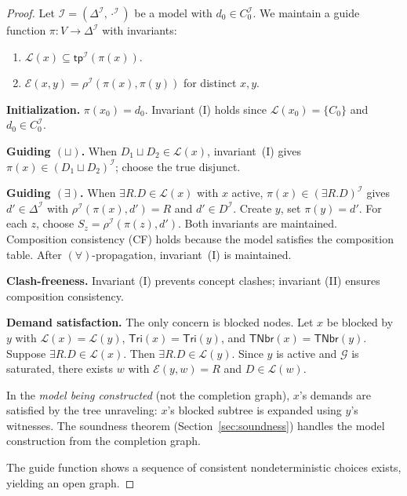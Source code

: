 \documentclass[a4paper,11pt]{article}
\theoremstyle{definition}
\newcommand{\tp}{\ensuremath{\mathsf{tp}}}
\newcommand{\Tri}{\ensuremath{\mathsf{Tri}}}
\newcommand{\TNbr}{\ensuremath{\mathsf{TNbr}}}
\newcommand{\interp}{\ensuremath{\mathcal{I}}}
\newcommand{\DeltaI}{\ensuremath{\Delta^{\mathcal{I}}}}
\newcommand{\GG}{\ensuremath{\mathcal{G}}}
\newcommand{\LL}{\ensuremath{\mathcal{L}}}
\newcommand{\EE}{\ensuremath{\mathcal{E}}}
\begin{document}
\begin{proof}
Let $\interp = (\DeltaI, \cdot^{\interp})$ be a model with
$d_0 \in C_0^{\interp}$.  We maintain a guide function
$\pi: V \to \DeltaI$ with invariants:
\begin{enumerate}[nosep,label=(\Roman*)]
  \item $\LL(x) \subseteq \tp^{\interp}(\pi(x))$.
  \item $\EE(x,y) = \rho^{\interp}(\pi(x), \pi(y))$ for
    distinct $x, y$.
\end{enumerate}

\medskip\noindent\textbf{Initialization.}\;
$\pi(x_0) = d_0$.  Invariant (I) holds since
$\LL(x_0) = \{C_0\}$ and $d_0 \in C_0^{\interp}$.

\medskip\noindent\textbf{Guiding $(\sqcup)$.}\;
When $D_1 \sqcup D_2 \in \LL(x)$, invariant~(I) gives
$\pi(x) \in (D_1 \sqcup D_2)^{\interp}$; choose the true
disjunct.

\medskip\noindent\textbf{Guiding $(\exists)$.}\;
When $\exists R.D \in \LL(x)$ with $x$ active,
$\pi(x) \in (\exists R.D)^{\interp}$ gives
$d' \in \DeltaI$ with $\rho^{\interp}(\pi(x), d') = R$ and
$d' \in D^{\interp}$.  Create $y$, set $\pi(y) = d'$.  For
each $z$, choose $S_z = \rho^{\interp}(\pi(z), d')$.
Both invariants are maintained.  Composition consistency (CF)
holds because the model satisfies the composition table.
After $(\forall)$-propagation, invariant~(I) is maintained.

\medskip\noindent\textbf{Clash-freeness.}\;
Invariant (I) prevents concept clashes; invariant (II) ensures
composition consistency.

\medskip\noindent\textbf{Demand satisfaction.}\;
The only concern is blocked nodes.  Let $x$ be blocked by $y$
with $\LL(x) = \LL(y)$, $\Tri(x) = \Tri(y)$, and
$\TNbr(x) = \TNbr(y)$.  Suppose
$\exists R.D \in \LL(x)$.  Then $\exists R.D \in \LL(y)$.
Since $y$ is active and $\GG$ is saturated, there exists
$w$ with $\EE(y,w) = R$ and $D \in \LL(w)$.

In the \emph{model being constructed} (not the completion graph),
$x$'s demands are satisfied by the tree unraveling: $x$'s
blocked subtree is expanded using $y$'s witnesses.  The
soundness theorem (Section~\ref{sec:soundness}) handles the
model construction from the completion graph.

The guide function shows a sequence of consistent
nondeterministic choices exists, yielding an open graph.
\end{proof}
\end{document}
